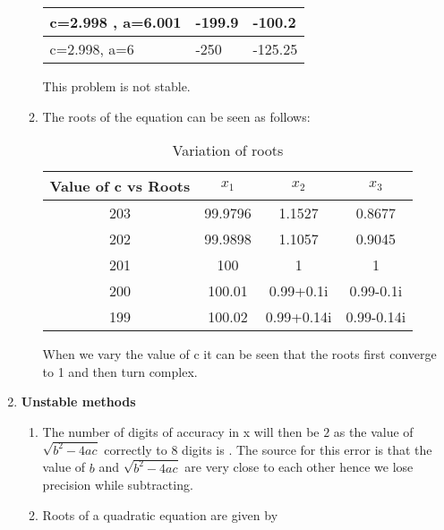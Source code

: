 \documentclass[11pt]{article}
\begin{document}
\begin{enumerate}
\begin{enumerate}
\begin{table}[!htb]
\begin{tabular}{|l|l|l|}
								c=2.998 , a=6.001               & -199.9                          & -100.2                          \\ \hline
								c=2.998, a=6                    & -250                            & -125.25                         \\ \hline
								\end{tabular}
								\end{table}
						This problem is not stable.
				\item 
					The roots of the equation can be seen as follows:\\
						\begin{table}[!htb]
						\centering
						\caption{Variation of roots}
						\label{my-label}
						\begin{tabular}{|c|c|c|c|}
						\hline
						\textbf{Value of c vs Roots} & \textbf{$x_1$} & \textbf{$x_2$} & \textbf{$x_3$} \\ \hline
						203                          & 99.9796        & 1.1527         & 0.8677         \\ \hline
						202                          & 99.9898        & 1.1057         & 0.9045         \\ \hline
						201                          & 100            & 1              & 1              \\ \hline
						200                          & 100.01         & 0.99+0.1i      & 0.99-0.1i      \\ \hline
						199                          & 100.02         & 0.99+0.14i     & 0.99-0.14i     \\ \hline
						\end{tabular}
						\end{table}
						When we vary the value of c it can be seen that the roots first converge to 1 and then turn complex.
			\end{enumerate}
	\item \textbf{Unstable methods} \\
		\begin{enumerate}
			\item %
				The number of digits of accuracy in x will then be $2$ as the value of $\sqrt{b^2 - 4ac}$ correctly to 8 digits is .
				The source for this error is that the value of $b$ and $\sqrt{b^2 -4ac}$ are very close to each other hence we lose precision while subtracting.
			\item %
				Roots of a quadratic equation are given by 
					\begin{align*}

\end{align*}
\end{enumerate}
\end{enumerate}
\end{document}
